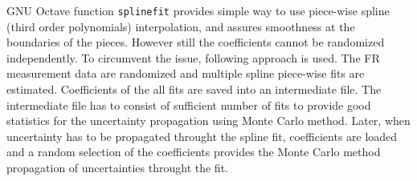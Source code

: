 GNU Octave function \texttt{splinefit} provides simple way to use piece-wise spline (third
order polynomials) interpolation, and assures smoothness at
the boundaries of the pieces. However still the coefficients cannot be
randomized independently. To circumvent the issue, following approach is used.
The FR measurement data are randomized and multiple spline piece-wise fits are
estimated. Coefficients of the all fits are saved into an intermediate file. The
intermediate file has to consist of sufficient number of fits to provide good
statistics for the uncertainty propagation using Monte Carlo method. Later, when
uncertainty has to be propagated throught the spline fit, coefficients are
loaded and a random selection of the coefficients provides the Monte Carlo
method propagation of uncertainties throught the fit.
